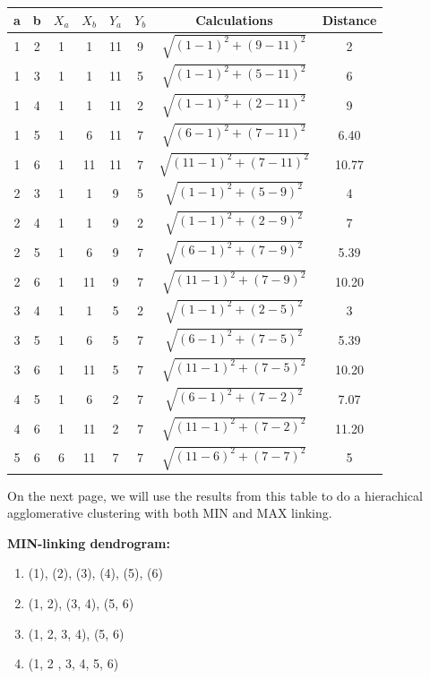 		\begin{table}[H]
			\begin{tabular}{ c | c | c | c | c | c | c | c }
				{\bf a} & {\bf b} & {\bf $X_{a}$} & {\bf $X_{b}$} & {\bf $Y_{a}$} & {\bf $Y_{b}$} 
				& {\bf Calculations} & {\bf Distance} \\ \hline
				1 & 2 & 1 & 1 & 11 & 9 & $\sqrt{(1-1)^{2} + (9-11)^{2}}$ & 2 \\
				1 & 3 & 1 & 1 & 11 & 5 & $\sqrt{(1-1)^{2} + (5-11)^{2}}$ & 6 \\
				1 & 4 & 1 & 1 & 11 & 2 & $\sqrt{(1-1)^{2} + (2-11)^{2}}$ & 9 \\
				1 & 5 & 1 & 6 & 11 & 7 & $\sqrt{(6-1)^{2} + (7-11)^{2}}$ & 6.40 \\
				1 & 6 & 1 & 11 & 11 & 7 & $\sqrt{(11-1)^{2} + (7-11)^{2}}$ & 10.77 \\
				2 & 3 & 1 & 1 & 9 & 5 & $\sqrt{(1-1)^{2} + (5-9)^{2}}$ & 4 \\
				2 & 4 & 1 & 1 & 9 & 2 & $\sqrt{(1-1)^{2} + (2-9)^{2}}$ & 7 \\
				2 & 5 & 1 & 6 & 9 & 7 & $\sqrt{(6-1)^{2} + (7-9)^{2}}$ & 5.39 \\
				2 & 6 & 1 & 11 & 9 & 7 & $\sqrt{(11-1)^{2} + (7-9)^{2}}$ & 10.20 \\
				3 & 4 & 1 & 1 & 5 & 2 & $\sqrt{(1-1)^{2} + (2-5)^{2}}$ & 3 \\
				3 & 5 & 1 & 6 & 5 & 7 & $\sqrt{(6-1)^{2} + (7-5)^{2}}$ & 5.39 \\
				3 & 6 & 1 & 11 & 5 & 7 & $\sqrt{(11-1)^{2} + (7-5)^{2}}$ & 10.20\\
				4 & 5 & 1 & 6 & 2 & 7 & $\sqrt{(6-1)^{2} + (7-2)^{2}}$ & 7.07 \\
				4 & 6 & 1 & 11 & 2 & 7 & $\sqrt{(11-1)^{2} + (7-2)^{2}}$ & 11.20 \\
				5 & 6 & 6 & 11 & 7 & 7 & $\sqrt{(11-6)^{2} + (7-7)^{2}}$ & 5 \\ \hline
			\end{tabular}
		\end{table}

		On the next page, we will use the results from this table to do a hierachical 
		agglomerative clustering with both MIN and MAX linking.

		{\bf MIN-linking dendrogram:}
			\begin{enumerate}
				\item (1), (2), (3), (4), (5), (6)
				\item (1, 2), (3, 4), (5, 6)
				\item (1, 2, 3, 4), (5, 6)
				\item (1, 2 , 3, 4, 5, 6)
			\end{enumerate}

